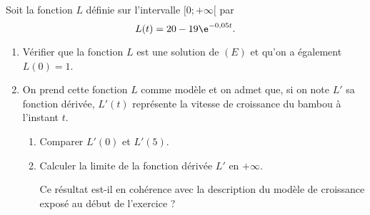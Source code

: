 Soit la fonction $L$ définie sur l'intervalle $[0;+\infty[$ par \[L(t) = 20 - 19\e^{-0,05t}.\]

\begin{enumerate}
	\item Vérifier que la fonction $L$ est une solution de $(E)$ et qu'on a également $L(0) = 1$.
	\item On prend cette fonction $L$ comme modèle et on admet que, si on note $L'$ sa fonction dérivée, $L'(t)$ représente la vitesse de croissance du bambou à l'instant $t$.
	\begin{enumerate}
		\item Comparer $L'(0)$ et $L'(5)$.
		\item Calculer la limite de la fonction dérivée $L'$ en $+\infty$. 
		
		Ce résultat est-il en cohérence avec la description du modèle de croissance exposé au début de l'exercice ?
	\end{enumerate}
\end{enumerate}

